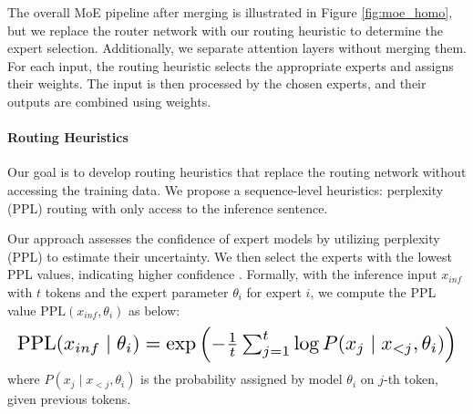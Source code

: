 
The overall MoE pipeline after merging is illustrated in Figure \ref{fig:moe_homo}, but we replace the router network with our routing heuristic to determine the expert selection. Additionally, we separate attention layers without merging them. For each input, the routing heuristic selects the appropriate experts and assigns their weights. The input is then processed by the chosen experts, and their outputs are combined using weights.

\paragraph{Routing Heuristics}


Our goal is to develop routing heuristics that replace the routing network without accessing the training data. We propose a sequence-level heuristics: perplexity (PPL) routing with only access to the inference sentence.


Our approach assesses the confidence of expert models by utilizing perplexity (PPL) to estimate their uncertainty. We then select the experts with the lowest PPL values, indicating higher confidence \cite{jelinek1977perplexity}.
Formally, with the inference input $x_{inf}$ with $t$ tokens and the expert parameter $\theta_i$ for expert $i$, we compute the PPL value $\text{PPL}(x_{inf}, \theta_i)$ as below:
\begin{equation*}
\resizebox{\columnwidth}{!}{%
    $\text{PPL}(x_{inf} \mid \theta_i) = \exp\left(-\frac{1}{t} \sum_{j=1}^{t} \log P(x_j \mid x_{<j}, \theta_i)\right)
    $%
    }
\end{equation*}
where $P(x_j \mid x_{<j}, \theta_i)$ is the probability assigned by model $\theta_i$ on $j$-th token, given previous tokens.

